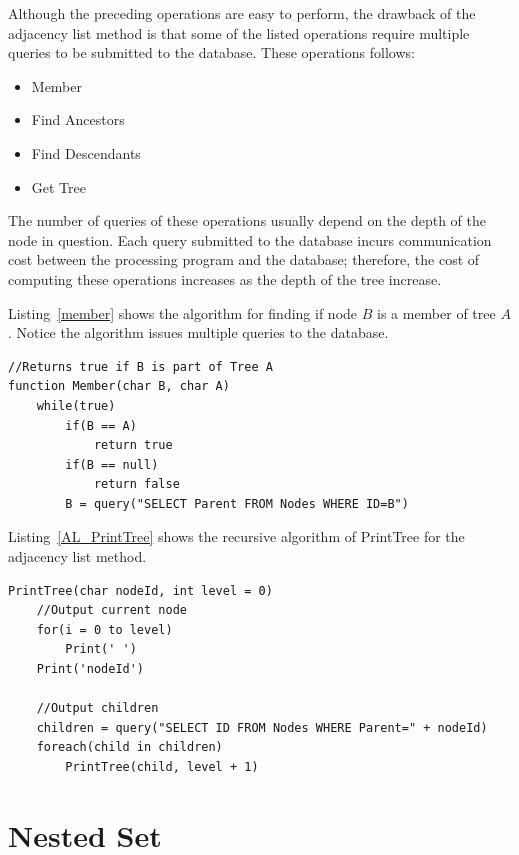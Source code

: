 Although the preceding operations are easy to perform, the drawback of the adjacency list method is that some of the listed operations require multiple queries to be submitted to the database. These operations follows:

\begin{itemize}
\item Member
\item Find Ancestors
\item Find Descendants
\item Get Tree
\end{itemize}

The number of queries of these operations usually depend on the depth of the node in question. Each query submitted to the database incurs communication cost between the processing program and the database; therefore, the cost of computing these operations increases as the depth of the tree increase.

Listing~\ref{member} shows the algorithm for finding if node $B$ is a member of tree $A$. Notice the algorithm issues multiple queries to the database.

\begin{lstlisting}[frame=single]
//Returns true if B is part of Tree A
function Member(char B, char A)
	while(true)
		if(B == A)
			return true
		if(B == null)
			return false
		B = query("SELECT Parent FROM Nodes WHERE ID=B")
\end{lstlisting}

Listing~\ref{AL_PrintTree} shows the recursive algorithm of PrintTree for the adjacency list method.

\begin{minipage}{\linewidth}
\begin{lstlisting}[frame=single]
PrintTree(char nodeId, int level = 0)
	//Output current node
	for(i = 0 to level)
		Print(' ')
	Print('nodeId')
	
	//Output children
	children = query("SELECT ID FROM Nodes WHERE Parent=" + nodeId)
	foreach(child in children)
		PrintTree(child, level + 1)
\end{lstlisting}	
\end{minipage}

\section{Nested Set}

